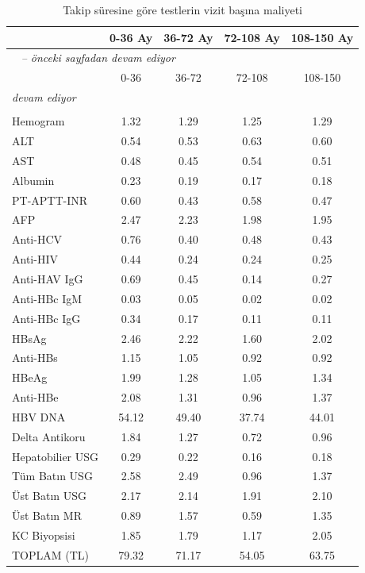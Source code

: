   \begin{longtable}{lcccc}\caption{Takip süresine göre testlerin vizit başına maliyeti} \label{tablo:tlvizit}\\
      \hline
        & 0-36 Ay & 36-72 Ay & 72-108 Ay & 108-150 Ay \\ 
  
     
      \hline
      \endfirsthead
      \multicolumn{5}{l}{\tablename\ \thetable{} \textit{-- önceki sayfadan devam ediyor}}\\
      \hline
        & 0-36 & 36-72 & 72-108 & 108-150 \\ 
      \hline
     
      \endhead
      \hline
      \multicolumn{5}{l}{\textit{devam ediyor}} \\
      \endfoot
      \multicolumn{3}{l}{}  \\
      \endlastfoot
   Hemogram & 1.32 & 1.29 & 1.25 & 1.29 \\ 
   ALT & 0.54 & 0.53 & 0.63 & 0.60 \\ 
   AST & 0.48 & 0.45 & 0.54 & 0.51 \\ 
   Albumin & 0.23 & 0.19 & 0.17 & 0.18 \\ 
   PT-APTT-INR & 0.60 & 0.43 & 0.58 & 0.47 \\
   AFP & 2.47 & 2.23 & 1.98 & 1.95 \\ 
   Anti-HCV & 0.76 & 0.40 & 0.48 & 0.43 \\ 
   Anti-HIV & 0.44 & 0.24 & 0.24 & 0.25 \\ 
   Anti-HAV IgG & 0.69 & 0.45 & 0.14 & 0.27 \\  
   Anti-HBc IgM & 0.03 & 0.05 & 0.02 & 0.02 \\ 
   Anti-HBc IgG & 0.34 & 0.17 & 0.11 & 0.11 \\ 
   HBsAg & 2.46 & 2.22 & 1.60 & 2.02 \\ 
   Anti-HBs & 1.15 & 1.05 & 0.92 & 0.92 \\ 
   HBeAg & 1.99 & 1.28 & 1.05 & 1.34 \\ 
   Anti-HBe & 2.08 & 1.31 & 0.96 & 1.37 \\ 
   HBV DNA & 54.12 & 49.40 & 37.74 & 44.01 \\ 
   Delta Antikoru & 1.84 & 1.27 & 0.72 & 0.96 \\ 
   Hepatobilier USG & 0.29 & 0.22 & 0.16 & 0.18 \\ 
   Tüm Batın USG & 2.58 & 2.49 & 0.96 & 1.37 \\ 
   Üst Batın USG & 2.17 & 2.14 & 1.91 & 2.10 \\ 
   Üst Batın MR & 0.89 & 1.57 & 0.59 & 1.35 \\ 
   KC Biyopsisi & 1.85 & 1.79 & 1.17 & 2.05 \\
   \hline
   TOPLAM (TL) & 79.32 & 71.17 & 54.05 & 63.75 \\
  \hline
                   \end{longtable}
                   


